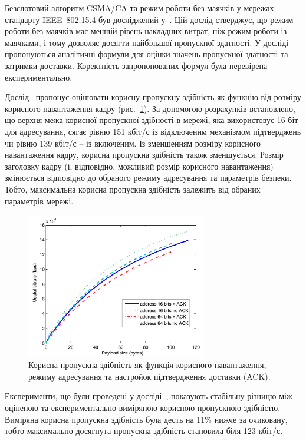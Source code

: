 \documentclass[a4paper,ukrainian,utf8,nocolumnsxix,floatsection]{eskdtext}
\newcommand{\figref}[1]{рис.~\ref{#1}}
\newcommand{\iee}[0]{IEEE~802.15.4\xspace}
\newcommand{\csma}[0]{CSMA/CA\xspace}
\begin{document}
Безслотовий алгоритм \csma та режим роботи без маячків у мережах стандарту \iee був досліджений у~\cite{thoroughput:analysis:unslotted:ieee}. Цій дослід стверджує, що режим роботи без маячків має меншій рівень накладних витрат, ніж режим роботи із маячками, і тому дозволяє досягти найбільшої пропускної здатності. У досліді пропонуються аналітичні формули для оцінки значень пропускної здатності та затримки доставки. Коректність запропонованих формул була перевірена експериментально.

Дослід~\cite{thoroughput:analysis:unslotted:ieee} пропонує оцінювати корисну пропускну здібність як функцію від розміру корисного навантаження кадру (\figref{fig:throughput_graph}). За допомогою розрахунків встановлено, що верхня межа корисної пропускної здібності в мережі, яка використовує 16 біт для адресування, сягає рівню 151 кбіт/с із відключеним механізмом підтверджень чи рівню 139 кбіт/с – із включеним. Із зменшенням розміру корисного навантаження кадру, корисна пропускна здібність також зменшується. Розмір заголовку кадру (і, відповідно, можливий розмір корисного навантаження) змінюється відповідно до обраного режиму адресування та параметрів безпеки. Тобто, максимальна корисна пропускна здібність залежить від обраних параметрів мережі.

\begin{figure}[bth]
	\centering
	\includegraphics[width=0.7\textwidth]{img/throughput_graph.png}
	\caption{\label{fig:throughput_graph}Корисна пропускна здібність як функція корисного навантаження, режиму адресування та настройок підтвердження доставки (ACK).}
\end{figure}

Експерименти, що були проведені у досліді~\cite{thoroughput:analysis:unslotted:ieee}, показують стабільну різницю між оціненою та експериментально виміряною корисною пропускною здібністю. Виміряна корисна пропускна здібність була десть на 11\% нижче за очиковану, тобто максимально досягнута пропускна здібність становила біля 123 кбіт/с.
\end{document}
